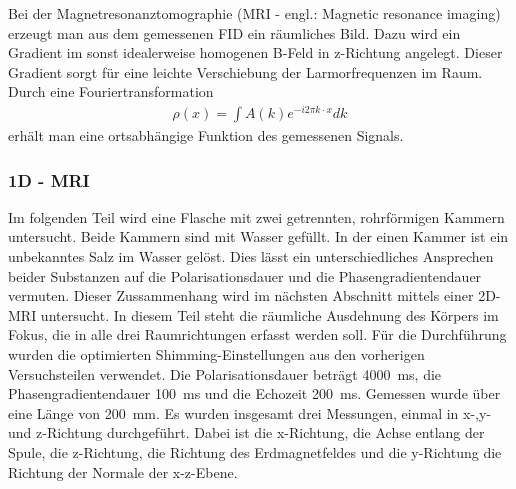 \documentclass[../../main.tex]{subfiles}
\begin{document}
    Bei der Magnetresonanztomographie (MRI - engl.: Magnetic resonance imaging) erzeugt man aus dem gemessenen FID ein räumliches Bild. Dazu wird ein Gradient im sonst idealerweise homogenen B-Feld in z-Richtung angelegt. Dieser Gradient sorgt für eine leichte Verschiebung der Larmorfrequenzen im Raum. Durch eine Fouriertransformation 
    \begin{align}
        \rho(x) = \int A(k) e^{-i2\pi k\cdot x}dk
    \end{align}
    erhält man eine ortsabhängige Funktion des gemessenen Signals.
    
    \subsubsection{1D - MRI}
        Im folgenden Teil wird eine Flasche mit zwei getrennten, rohrförmigen Kammern untersucht. Beide Kammern sind mit Wasser gefüllt. In der einen Kammer ist ein unbekanntes Salz im Wasser gelöst. Dies lässt ein unterschiedliches Ansprechen beider Substanzen auf die Polarisationsdauer und die Phasengradientendauer vermuten. Dieser Zussammenhang wird im nächsten Abschnitt mittels einer 2D-MRI untersucht. In diesem Teil steht die räumliche Ausdehnung des Körpers im Fokus, die in alle drei Raumrichtungen erfasst werden soll. Für die Durchführung wurden die optimierten Shimming-Einstellungen aus den vorherigen Versuchsteilen verwendet. Die Polarisationsdauer beträgt \SI{4000}{\milli \second}, die Phasengradientendauer \SI{100}{\milli \second} und die Echozeit \SI{200}{\milli \second}. Gemessen wurde über eine Länge von \SI{200}{\milli \metre}. Es wurden insgesamt drei Messungen, einmal in x-,y- und z-Richtung durchgeführt. Dabei ist die x-Richtung, die Achse entlang der Spule, die z-Richtung, die Richtung des Erdmagnetfeldes und die y-Richtung die Richtung der Normale der x-z-Ebene.
\end{document}

